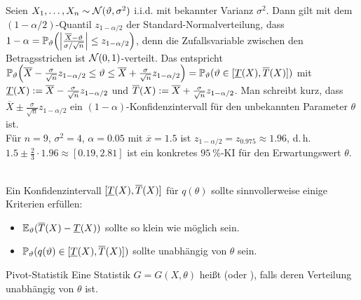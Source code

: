 \begin{Bsp}
    Seien $X_1, \dotsc, X_n \sim \mathcal{N}(\vartheta, \sigma^2)$ i.i.d. mit bekannter Varianz $\sigma^2$.
    Dann gilt mit dem $(1 - \alpha/2)$-Quantil $z_{1-\alpha/2}$
    der Standard-Normalverteilung, dass
    $1 - \alpha =
    \mathbb{P}_\vartheta\!\left(\left|\frac{\overline{X} - \vartheta}{\sigma/\sqrt{n}}\right| \le
    z_{1-\alpha/2}\right)$,
    denn die Zufallsvariable zwischen den Betragsstrichen ist $\mathcal{N}(0, 1)$-verteilt.
    Das entspricht\\
    $\mathbb{P}_\vartheta\!\left(\overline{X} - \frac{\sigma}{\sqrt{n}} z_{1-\alpha/2} \le \vartheta \le
    \overline{X} + \frac{\sigma}{\sqrt{n}} z_{1-\alpha/2}\right)
    = \mathbb{P}_\vartheta(\vartheta \in [\underline{T}(X), \overline{T}(X)])$ mit
    $\underline{T}(X) := \overline{X} - \frac{\sigma}{\sqrt{n}} z_{1-\alpha/2}$ und
    $\overline{T}(X) := \overline{X} + \frac{\sigma}{\sqrt{n}} z_{1-\alpha/2}$.
    Man schreibt kurz, dass $\overline{X} \pm \frac{\sigma}{\sqrt{n}} z_{1-\alpha/2}$ ein
    $(1 - \alpha)$-Konfidenzintervall für den unbekannten Parameter $\theta$ ist.\\
    Für $n = 9$, $\sigma^2 = 4$, $\alpha = \num{0.05}$ mit $\overline{x} = \num{1.5}$ ist
    $z_{1-\alpha/2} = z_{0.975} \approx \num{1.96}$, d.\,h.\\
    $\num{1.5} \pm \frac{2}{3} \cdot \num{1.96} \approx [\num{0.19}, \num{2.81}]$ ist ein
    konkretes $\SI{95}{\percent}$-KI für den Erwartungswert $\theta$.
\end{Bsp}

\linie

\begin{Bem}\\
    Ein Konfidenzintervall $[\underline{T}(X), \overline{T}(X)]$ für $q(\theta)$ sollte sinnvollerweise
    einige Kriterien erfüllen:
    \begin{itemize}
        \item
        $\mathbb{E}_\vartheta(\overline{T}(X) - \underline{T}(X))$ sollte so klein wie möglich sein.

        \item
        $\mathbb{P}_\vartheta(q(\vartheta) \in [\underline{T}(X), \overline{T}(X)])$ sollte unabhängig von $\theta$ sein.
    \end{itemize}
\end{Bem}

\begin{Def}{Pivot-Statistik}
    Eine Statistik $G = G(X, \theta)$ heißt  (oder ),
    falls deren Verteilung unabhängig von $\theta$ ist.
\end{Def}

